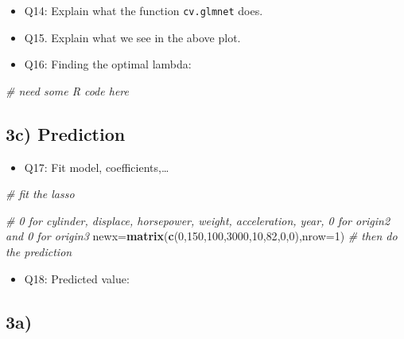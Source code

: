 \documentclass[]{article}
\newenvironment{Shaded}{\begin{snugshade}}{\end{snugshade}}
\newcommand{\KeywordTok}[1]{\textcolor[rgb]{0.13,0.29,0.53}{\textbf{#1}}}
\newcommand{\DataTypeTok}[1]{\textcolor[rgb]{0.13,0.29,0.53}{#1}}
\newcommand{\DecValTok}[1]{\textcolor[rgb]{0.00,0.00,0.81}{#1}}
\newcommand{\CommentTok}[1]{\textcolor[rgb]{0.56,0.35,0.01}{\textit{#1}}}
\newcommand{\NormalTok}[1]{#1}
\providecommand{\tightlist}{%
  \setlength{\itemsep}{0pt}\setlength{\parskip}{0pt}}
\begin{document}
\begin{itemize}
\tightlist
\item
  Q14: Explain what the function \texttt{cv.glmnet} does.
\item
  Q15. Explain what we see in the above plot.
\item
  Q16: Finding the optimal lambda:
\end{itemize}

\begin{Shaded}
\begin{Highlighting}[]
\CommentTok{# need some R code here}
\end{Highlighting}
\end{Shaded}

\subsection{3c) Prediction}\label{c-prediction}

\begin{itemize}
\tightlist
\item
  Q17: Fit model, coefficients,\ldots{}
\end{itemize}

\begin{Shaded}
\begin{Highlighting}[]
\CommentTok{# fit the lasso}
\end{Highlighting}
\end{Shaded}

\begin{Shaded}
\begin{Highlighting}[]
\CommentTok{# 0 for cylinder, displace, horsepower, weight, acceleration, year, 0 for origin2 and 0 for origin3}
\NormalTok{newx=}\KeywordTok{matrix}\NormalTok{(}\KeywordTok{c}\NormalTok{(}\DecValTok{0}\NormalTok{,}\DecValTok{150}\NormalTok{,}\DecValTok{100}\NormalTok{,}\DecValTok{3000}\NormalTok{,}\DecValTok{10}\NormalTok{,}\DecValTok{82}\NormalTok{,}\DecValTok{0}\NormalTok{,}\DecValTok{0}\NormalTok{),}\DataTypeTok{nrow=}\DecValTok{1}\NormalTok{)}
\CommentTok{# then do the prediction}
\end{Highlighting}
\end{Shaded}

\begin{itemize}
\tightlist
\item
  Q18: Predicted value:
\end{itemize}

\subsection{3a)}\label{a-1}
\end{document}
